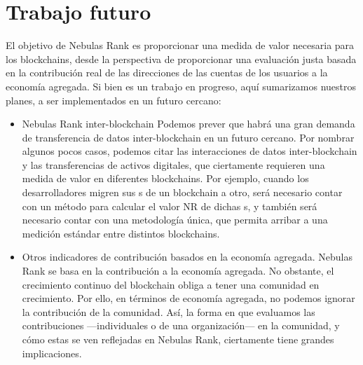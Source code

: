 \section{Trabajo futuro}
El objetivo de Nebulas Rank es proporcionar una medida de valor necesaria para los blockchains, desde la perspectiva de proporcionar una evaluación justa basada en la contribución real de las direcciones de las cuentas de los usuarios a la economía agregada. Si bien es un trabajo en progreso, aquí sumarizamos nuestros planes, a ser implementados en un futuro cercano:
\begin{itemize}
	\item{Nebulas Rank inter-blockchain} Podemos prever que habrá una gran demanda de transferencia de datos inter-blockchain en un futuro cercano. Por nombrar algunos pocos casos, podemos citar las interacciones de datos inter-blockchain y las transferencias de activos digitales, que ciertamente requieren una medida de valor en diferentes blockchains. Por ejemplo, cuando los desarrolladores migren sus {\dapp}s de un blockchain a otro, será necesario contar con un método para calcular el valor NR de dichas {\dapp}s, y también será necesario contar con una metodología única, que permita arribar a una medición estándar entre distintos blockchains.
	\item{Otros indicadores de contribución basados en la economía agregada.} Nebulas Rank se basa en la contribución a la economía agregada. No obstante, el crecimiento continuo del blockchain obliga a tener una comunidad en crecimiento. Por ello, en términos de economía agregada, no podemos ignorar la contribución de la comunidad. Así, la forma en que evaluamos las contribuciones —individuales o de una organización— en la comunidad, y cómo estas se ven reflejadas en Nebulas Rank, ciertamente tiene grandes implicaciones.
\end{itemize}